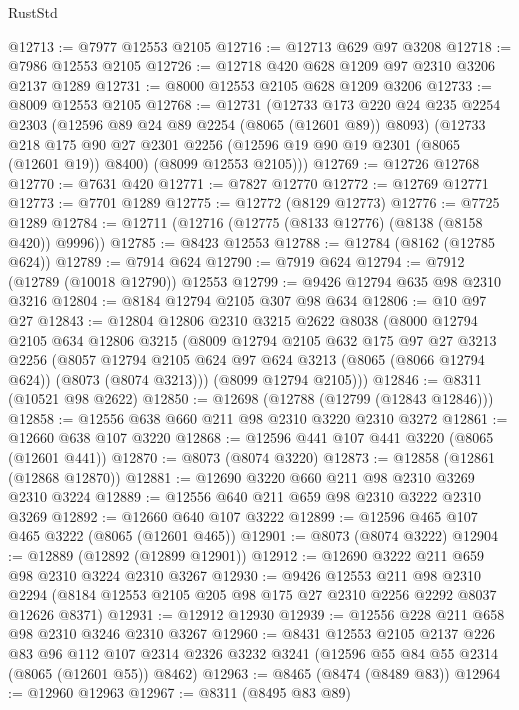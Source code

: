 \begin{lexlean}{RustStd}
\begin{coremodule}
@12713 := @7977 @12553 @2105
@12716 := @12713 @629 @97 @3208
@12718 := @7986 @12553 @2105
@12726 := @12718 @420 @628 @1209 @97 @2310 @3206 @2137 @1289
@12731 := @8000 @12553 @2105 @628 @1209 @3206
@12733 := @8009 @12553 @2105
@12768 := @12731
    (@12733
      @173
      @220
      @24
      @235
      @2254
      @2303
      (@12596 @89 @24 @89 @2254 (@8065 (@12601 @89)) @8093)
      (@12733
        @218
        @175
        @90
        @27
        @2301
        @2256
        (@12596 @19 @90 @19 @2301 (@8065 (@12601 @19)) @8400)
        (@8099 @12553 @2105)))
@12769 := @12726 @12768
@12770 := @7631 @420
@12771 := @7827 @12770
@12772 := @12769 @12771
@12773 := @7701 @1289
@12775 := @12772 (@8129 @12773)
@12776 := @7725 @1289
@12784 := @12711 (@12716 (@12775 (@8133 @12776) (@8138 (@8158 @420)) @9996))
@12785 := @8423 @12553
@12788 := @12784 (@8162 (@12785 @624))
@12789 := @7914 @624
@12790 := @7919 @624
@12794 := @7912 (@12789 (@10018 @12790)) @12553
@12799 := @9426 @12794 @635 @98 @2310 @3216
@12804 := @8184 @12794 @2105 @307 @98 @634
@12806 := @10 @97 @27
@12843 := @12804
    @12806
    @2310
    @3215
    @2622
    @8038
    (@8000
      @12794
      @2105
      @634
      @12806
      @3215
      (@8009
        @12794
        @2105
        @632
        @175
        @97
        @27
        @3213
        @2256
        (@8057 @12794 @2105 @624 @97 @624 @3213 (@8065 (@8066 @12794 @624)) (@8073 (@8074 @3213)))
        (@8099 @12794 @2105)))
@12846 := @8311 (@10521 @98 @2622)
@12850 := @12698 (@12788 (@12799 (@12843 @12846)))
@12858 := @12556 @638 @660 @211 @98 @2310 @3220 @2310 @3272
@12861 := @12660 @638 @107 @3220
@12868 := @12596 @441 @107 @441 @3220 (@8065 (@12601 @441))
@12870 := @8073 (@8074 @3220)
@12873 := @12858 (@12861 (@12868 @12870))
@12881 := @12690 @3220 @660 @211 @98 @2310 @3269 @2310 @3224
@12889 := @12556 @640 @211 @659 @98 @2310 @3222 @2310 @3269
@12892 := @12660 @640 @107 @3222
@12899 := @12596 @465 @107 @465 @3222 (@8065 (@12601 @465))
@12901 := @8073 (@8074 @3222)
@12904 := @12889 (@12892 (@12899 @12901))
@12912 := @12690 @3222 @211 @659 @98 @2310 @3224 @2310 @3267
@12930 := @9426
    @12553
    @211
    @98
    @2310
    @2294
    (@8184 @12553 @2105 @205 @98 @175 @27 @2310 @2256 @2292 @8037 @12626 @8371)
@12931 := @12912 @12930
@12939 := @12556 @228 @211 @658 @98 @2310 @3246 @2310 @3267
@12960 := @8431
    @12553
    @2105
    @2137
    @226
    @83
    @96
    @112
    @107
    @2314
    @2326
    @3232
    @3241
    (@12596 @55 @84 @55 @2314 (@8065 (@12601 @55)) @8462)
@12963 := @8465 (@8474 (@8489 @83))
@12964 := @12960 @12963
@12967 := @8311 (@8495 @83 @89)

\end{coremodule}
\end{lexlean}
